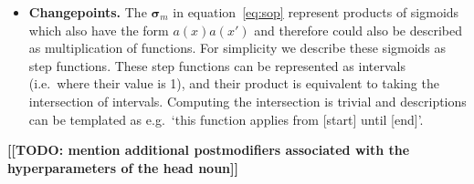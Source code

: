 \documentclass[letterpaper]{article}
\def\ie{i.e.\ }
\def\eg{e.g.\ }
\begin{document}
\begin{itemize}

\item {\bf Changepoints.}
The $\boldsymbol\sigma_m$ in equation~\eqref{eq:sop} represent products of sigmoids which also have the form $a(x)a(x')$ and therefore could also be described as multiplication of functions.
For simplicity we describe these sigmoids as step functions\footnotemark.
These step functions can be represented as intervals (\ie where their value is 1), and their product is equivalent to taking the intersection of intervals.
Computing the intersection is trivial and descriptions can be templated as \eg `this function applies from [start] until [end]'.



\end{itemize}

{\bf [[TODO: mention additional postmodifiers associated with the hyperparameters of the head noun]]}

\end{document}
